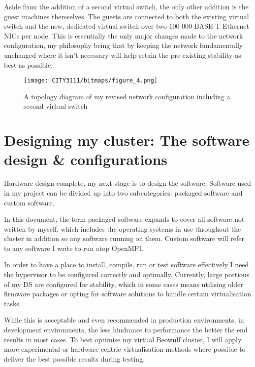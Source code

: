 Aside from the addition of a second virtual switch, the only other addition is the guest machines themselves. The guests are connected to both the existing virtual switch and the new, dedicated virtual switch over two 100 000 BASE-T Ethernet NICs per node. This is essentially the only major changes made to the network configuration, my philosophy being that by keeping the network fundamentally unchanged where it isn't necessary will help retain the pre-existing stability as best as possible.
\vfill\break

\begin{figure}[H]
    \texttt{[image: CITY3111/bitmaps/figure\_4.png]}
    \caption{A topology diagram of my revised network configuration including a second virtual switch}
    \label{figure_4}
\end{figure}

\section{Designing my cluster: The software design \& configurations}
Hardware design complete, my next stage is to design the software. Software used in my project can be divided up into two subcategories: packaged software and custom software.

In this document, the term packaged software expands to cover all software not written by myself, which includes the operating systems in use throughout the cluster in addition so any software running on them. Custom software will refer to any software I write to run atop OpenMPI.

\textbf{}

In order to have a place to install, compile, run or test software effectively I need the hypervisor to be configured correctly and optimally. Currently, large portions of my DS are configured for stability, which in some cases means utilising older firmware packages or opting for software solutions to handle certain virtualisation tasks.

While this is acceptable and even recommended in production environments, in development environments, the less hindrance to performance the better the end results in most cases. To best optimise my virtual Beowulf cluster, I will apply more experimental or hardware-centric virtualisation methods where possible to deliver the best possible results during testing.

